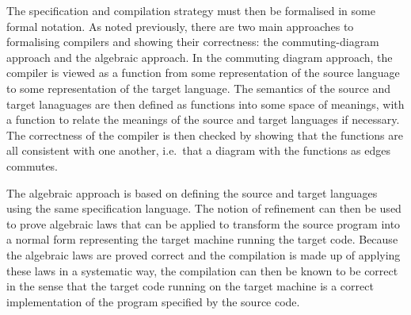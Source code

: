 \documentclass[a4paper,10pt]{report}
\begin{document}
The specification and compilation strategy must then be formalised in
some formal notation.
As noted previously, there are two main approaches to formalising
compilers and showing their correctness: the commuting-diagram
approach and the algebraic approach.
In the commuting diagram approach, the compiler is viewed as a
function from some representation of the source language to some
representation of the target language.
The semantics of the source and target lanaguages are then defined as
functions into some space of meanings, with a function to relate the
meanings of the source and target languages if necessary.
The correctness of the compiler is then checked by showing that the
functions are all consistent with one another, i.e.\ that a diagram
with the functions as edges commutes.

The algebraic approach is based on defining the source and target
languages using the same specification language.
The notion of refinement can then be used to prove algebraic laws
that can be applied to transform the source program into a normal form
representing the target machine running the target code.
Because the algebraic laws are proved correct and the compilation is
made up of applying these laws in a systematic way, the compilation
can then be known to be correct in the sense that the target code
running on the target machine is a correct implementation of the
program specified by the source code.

\printbibliography
\end{document}
